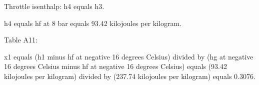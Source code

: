 Throttle isenthalp: h4 equals h3.

h4 equals hf at 8 bar equals 93.42 kilojoules per kilogram.

Table A11:

x1 equals (h1 minus hf at negative 16 degrees Celsius) divided by (hg at negative 16 degrees Celsius minus hf at negative 16 degrees Celsius) equals (93.42 kilojoules per kilogram) divided by (237.74 kilojoules per kilogram) equals 0.3076.